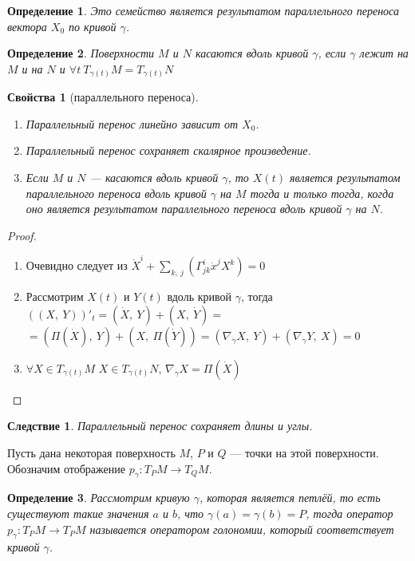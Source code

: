 \documentclass[12pt]{article}
\newcommand\tab[1][.5cm]{\hspace*{#1}}
\theoremstyle{plain}
\newtheorem{consequence}{Следствие}[theorem]
\newtheorem{propertes}{Свойства}
\newtheorem{definition}{Определение}[section]
\begin{document}
    \begin{definition}
        Это семейство является результатом параллельного переноса вектора $X_0$ по кривой $\gamma$.
    \end{definition}
    \begin{definition}
        Поверхности $M$ и $N$ касаются вдоль кривой $\gamma$, если $\gamma$ лежит на $M$ и на $N$ и $\forall t \ T_{\gamma(t)}M=T_{\gamma(t)}N$
    \end{definition}
    \begin{propertes}[параллельного переноса]\tab
        \hypertarget{6}{}
        \begin{enumerate}
            \item Параллельный перенос линейно зависит от $X_0$.
            \item Параллельный перенос сохраняет скалярное произведение.
            \item Если $M$ и $N$ --- касаются вдоль кривой $\gamma$, то $X(t)$ является результатом параллельного переноса вдоль кривой $\gamma$ на $M$ тогда и только тогда, когда оно является результатом параллельного переноса вдоль кривой $\gamma$ на $N$.
        \end{enumerate}
    \end{propertes}
    \begin{proof}\tab
        \begin{enumerate}
            \item Очевидно следует из $\dot{X}^i+\sum\limits_{k, \ j}(\Gamma_{jk}^i\dot{x}^jX^k)=0$
            \item Рассмотрим $X(t)$ и $Y(t)$ вдоль кривой $\gamma$, тогда $((X, \ Y))'_t=(\dot{X}, \ Y)+(X, \ \dot{Y})=$ $=(\Pi(\dot{X}), \ Y)+(X, \ \Pi(\dot{Y}))=(\nabla_{\dot{\gamma}}X, \ Y)+(\nabla_{\dot{\gamma}}Y, \ X)=0$
            \item $\forall X\in T_{\gamma(t)}M$ $X\in T_{\gamma(t)}N$, $\nabla_{\dot{\gamma}}X=\Pi(\dot{X})$
        \end{enumerate}
    \end{proof}
    \begin{consequence}
        Параллельный перенос сохраняет длины и углы.
    \end{consequence}
    Пусть дана некоторая поверхность $M$, $P$ и $Q$ --- точки на этой поверхности. Обозначим отображение $p_{\gamma}:T_PM\to T_QM$.
    \begin{definition}
        Рассмотрим кривую $\gamma$, которая является петлёй, то есть существуют такие значения $a$ и $b$, что $\gamma(a)=\gamma(b)=P$, тогда оператор $p_{\gamma}:T_PM\to T_PM$ называется оператором голономии, который соответствует кривой $\gamma$.
    \end{definition}
\end{document}
